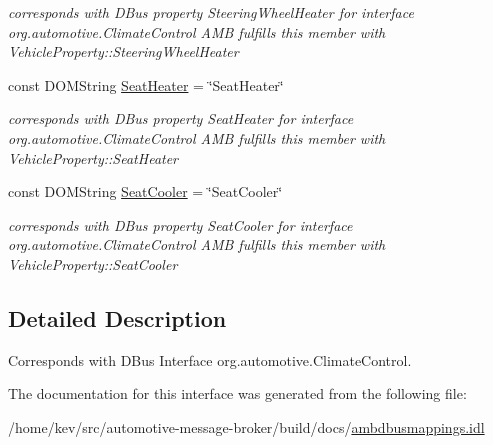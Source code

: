 \begin{DoxyCompactItemize}
\begin{DoxyCompactList}\small\item\em corresponds with D\+Bus property Steering\+Wheel\+Heater for interface org.\+automotive.\+Climate\+Control A\+M\+B fulfills this member with Vehicle\+Property\+::\+Steering\+Wheel\+Heater \end{DoxyCompactList}\item 
\hypertarget{interfaceClimateControl_a1888bc9e70f14f17edcf846b97ddfc81}{const D\+O\+M\+String \hyperlink{interfaceClimateControl_a1888bc9e70f14f17edcf846b97ddfc81}{Seat\+Heater} = \char`\"{}Seat\+Heater\char`\"{}}\label{interfaceClimateControl_a1888bc9e70f14f17edcf846b97ddfc81}

\begin{DoxyCompactList}\small\item\em corresponds with D\+Bus property Seat\+Heater for interface org.\+automotive.\+Climate\+Control A\+M\+B fulfills this member with Vehicle\+Property\+::\+Seat\+Heater \end{DoxyCompactList}\item 
\hypertarget{interfaceClimateControl_a116764f8cfe272dd5418fc418d07cb47}{const D\+O\+M\+String \hyperlink{interfaceClimateControl_a116764f8cfe272dd5418fc418d07cb47}{Seat\+Cooler} = \char`\"{}Seat\+Cooler\char`\"{}}\label{interfaceClimateControl_a116764f8cfe272dd5418fc418d07cb47}

\begin{DoxyCompactList}\small\item\em corresponds with D\+Bus property Seat\+Cooler for interface org.\+automotive.\+Climate\+Control A\+M\+B fulfills this member with Vehicle\+Property\+::\+Seat\+Cooler \end{DoxyCompactList}\end{DoxyCompactItemize}


\subsection{Detailed Description}
Corresponds with D\+Bus Interface org.\+automotive.\+Climate\+Control. 

The documentation for this interface was generated from the following file\+:\begin{DoxyCompactItemize}
\item 
/home/kev/src/automotive-\/message-\/broker/build/docs/\hyperlink{ambdbusmappings_8idl}{ambdbusmappings.\+idl}\end{DoxyCompactItemize}
